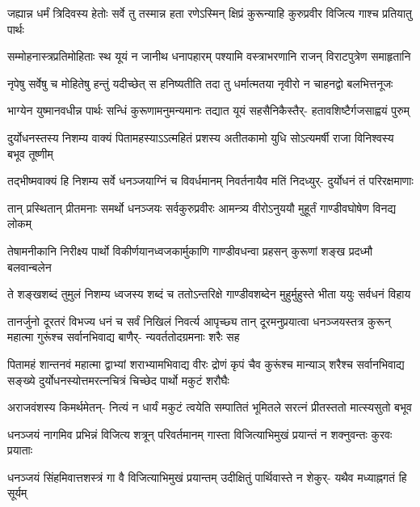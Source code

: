 \fourlineindentedshloka
{जह्यान्न धर्मं त्रिदिवस्य हेतोः}
{सर्वे तु तस्मान्न हता रणेऽस्मिन्}
{क्षिप्रं कुरून्याहि कुरुप्रवीर}
{विजित्य गाश्च प्रतियातु पार्थः}


\fourlineindentedshloka
{सम्मोहनास्त्रप्रतिमोहिताः स्थ}
{यूयं न जानीथ धनापहारम्}
{पश्यामि वस्त्राभरणानि राजन्}
{विराटपुत्रेण समाहृतानि}


\fourlineindentedshloka
{नृपेषु सर्वेषु च मोहितेषु}
{हन्तुं यदीच्छेत् स हनिष्यतीति}
{तदा तु धर्मात्मतया नृवीरो}
{न चाहनद्वो बलभित्तनूजः}


\fourlineindentedshloka
{भाग्येन युष्मानवधीन्न पार्थः}
{सन्धिं कुरूणामनुमन्यमानः}
{तद्यात यूयं सहसैनिकैस्तैर्-}
{हतावशिष्टैर्गजसाह्वयं पुरुम्}



\fourlineindentedshloka
{दुर्योधनस्तस्य निशम्य वाक्यं}
{पितामहस्याऽऽत्महितं प्रशस्य}
{अतीतकामो युधि सोऽत्यमर्षी}
{राजा विनिश्वस्य बभूव तूष्णीम्}


\fourlineindentedshloka
{तद्भीष्मवाक्यं हि निशम्य सर्वे}
{धनञ्जयाग्निं च विवर्धमानम्}
{निवर्तनायैव मतिं निदध्युर्-}
{दुर्योधनं तं परिरक्षमाणाः}


\fourlineindentedshloka
{तान् प्रस्थितान् प्रीतमनाः समर्थो}
{धनञ्जयः सर्वकुरुप्रवीरः}
{आमन्त्र्य वीरोऽनुययौ मुहूर्तं}
{गाण्डीवघोषेण विनद्य लोकम्}


\fourlineindentedshloka
{तेषामनीकानि निरीक्ष्य पार्थो}
{विकीर्णयानध्वजकार्मुकाणि}
{गाण्डीवधन्वा प्रहसन् कुरूणां}
{शङ्ख प्रदध्मौ बलवान्बलेन}


\fourlineindentedshloka
{ते शङ्खशब्दं तुमुलं निशम्य}
{ध्वजस्य शब्दं च ततोऽन्तरिक्षे}
{गाण्डीवशब्देन मुहुर्मुहुस्ते}
{भीता ययुः सर्वधनं विहाय}


\sixlineindentedshloka
{तानर्जुनो दूरतरं विभज्य}
{धनं च सर्वं निखिलं निवर्त्य}
{आपृच्छ्य तान् दूरमनुप्रयात्वा}
{धनञ्जयस्तत्र कुरून् महात्मा}
{गुरूंश्च सर्वानभिवाद्य बाणैर्-}
{न्यवर्ततोदग्रमनाः शरैः सह}


\sixlineindentedshloka
{पितामहं शान्तनवं महात्मा}
{द्वाभ्यां शराभ्यामभिवाद्य वीरः}
{द्रोणं कृपं चैव कुरूंश्च मान्याञ्}
{शरैश्च सर्वानभिवाद्य सङ्ख्ये}
{दुर्योधनस्योत्तमरत्नचित्रं}
{चिच्छेद पार्थो मकुटं शरौघैः}


\fourlineindentedshloka
{अराजवंशस्य किमर्थमेतन्-}
{नित्यं न धार्यं मकुटं त्वयेति}
{सम्पातितं भूमितले सरत्नं}
{प्रीतस्ततो मात्स्यसुतो बभूव}


\fourlineindentedshloka
{धनञ्जयं नागमिव प्रभिन्नं}
{विजित्य शत्रून् परिवर्तमानम्}
{गास्ता विजित्याभिमुखं प्रयान्तं}
{न शक्नुवन्तः कुरवः प्रयाताः}


\fourlineindentedshloka
{धनञ्जयं सिंहमिवात्तशस्त्रं}
{गा वै विजित्याभिमुखं प्रयान्तम्}
{उदीक्षितुं पार्थिवास्ते न शेकुर्-}
{यथैव मध्याह्नगतं हि सूर्यम्}



